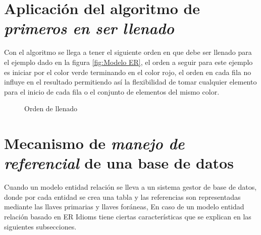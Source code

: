 \section{Aplicaci\'on del algoritmo de \textit{primeros en ser llenado}}
Con el algoritmo se llega a tener el siguiente orden en que debe ser llenado para el ejemplo dado en la figura  \ref{fig:Modelo ER}, el orden a seguir para este ejemplo es iniciar por el color verde terminando en el color rojo, el orden en cada fila no influye en el resultado permitiendo as\'i la flexibilidad de tomar cualquier elemento para el inicio de cada fila o el conjunto de elementos del mismo color.
\begin{figure}[H]
\centering
{}
\caption{Orden de llenado}
\label{fig:Orden de llenado}
\end{figure}
\section{Mecanismo de \textit{manejo de referencial} de una base de datos}
Cuando un modelo entidad relaci\'on se lleva a un sistema gestor de base de datos, donde por cada entidad se crea una tabla y las  referencias son representadas mediante las llaves primarias y llaves for\'aneas, En caso de un modelo entidad relaci\'on basado en ER Idioms tiene ciertas caracter\'isticas que se explican en las siguientes subsecciones.
